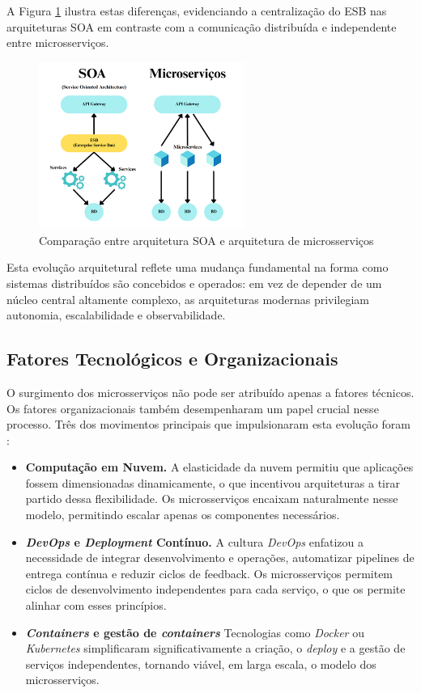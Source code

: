 A Figura \ref{fig:soa_microservicos} ilustra estas diferenças, evidenciando a centralização do ESB nas arquiteturas SOA em contraste com a comunicação distribuída e independente entre microsserviços.


\begin{figure}[H]
    \centering
    \includegraphics[width=0.6\textwidth]{images/Diagramas/soa_vs_microservicos.png}
    \caption{Comparação entre arquitetura SOA e arquitetura de microsserviços}
    \label{fig:soa_microservicos}
\end{figure}

Esta evolução arquitetural reflete uma mudança fundamental na forma como sistemas distribuídos são concebidos e operados: em vez de depender de um núcleo central altamente complexo, as arquiteturas modernas privilegiam autonomia, escalabilidade e observabilidade. 

\subsection{Fatores Tecnológicos e Organizacionais}

O surgimento dos microsserviços não pode ser atribuído apenas a fatores técnicos. Os fatores organizacionais também desempenharam um papel crucial nesse processo. Três dos movimentos principais que impulsionaram esta evolução foram \cite{Newman2015}:

\begin{itemize}
    \item \textbf{Computação em Nuvem.} A elasticidade da nuvem permitiu que aplicações fossem dimensionadas dinamicamente, o que incentivou arquiteturas a tirar partido dessa flexibilidade. Os microsserviços encaixam naturalmente nesse modelo, permitindo escalar apenas os componentes necessários.
    \item \textbf{\textit{DevOps} e \textit{Deployment} Contínuo.} A cultura \textit{DevOps} enfatizou a necessidade de integrar desenvolvimento e operações, automatizar pipelines de entrega contínua e reduzir ciclos de feedback. Os microsserviços permitem ciclos de desenvolvimento independentes para cada serviço, o que os permite alinhar com esses princípios.
    \item \textbf{\textit{Containers} e gestão de \textit{containers} } Tecnologias como \textit{Docker} ou \textit{Kubernetes} simplificaram significativamente a criação, o \textit{deploy} e a gestão de serviços independentes, tornando viável, em larga escala, o modelo dos microsserviços.
\end{itemize}

